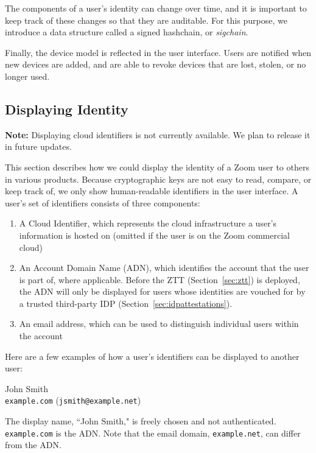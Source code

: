 The components of a user's identity can change over time, and it is important to keep track of these
changes so that they are auditable. For this purpose, we introduce a data structure called a signed
hashchain, or \textit{sigchain}.

Finally, the device model is reflected in the user interface. Users are notified when new devices
are added, and are able to revoke devices that are lost, stolen, or no longer used.

\subsection{Displaying Identity}
\label{subsec:displayid}

\textbf{Note:} Displaying cloud identifiers is not currently available. We plan to release it in future updates.

This section describes how we could display the identity of a Zoom user to others in various
products. Because cryptographic keys are not easy to read, compare, or keep track of, we only show
human-readable identifiers in the user interface. A user's set of identifiers consists of three
components:

\begin{enumerate}
\item A Cloud Identifier, which represents the cloud infrastructure a user's
information is hosted on (omitted if the user is on the Zoom commercial cloud)
\item An Account Domain Name (ADN), which identifies the account that the user
is part of, where applicable. Before the ZTT (Section~\ref{sec:ztt}) is
deployed, the ADN will only be displayed for users whose identities are vouched
for by a trusted third-party IDP (Section~\ref{sec:idpattestations}).
\item
    An email address, which can be used to distinguish individual users within the account
\end{enumerate}

Here are a few examples of how a user's identifiers can be displayed to another user:

\begin{multicols}{2}
John Smith \\
\texttt{example.com} (\texttt{jsmith@example.net})

\columnbreak

The display name, ``John Smith," is freely chosen and not authenticated. \texttt{example.com} is the
ADN\@. Note that the email domain, \texttt{example.net}, can differ from the ADN\@.
\end{multicols}


